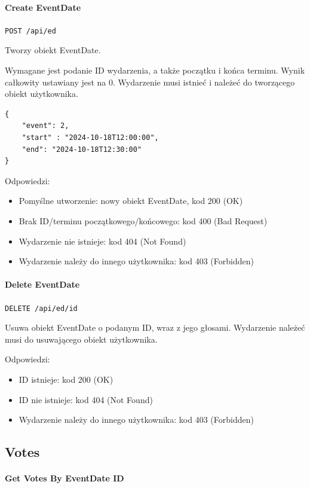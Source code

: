 \documentclass[a4paper,twoside,12pt]{book}
\begin{document}
\paragraph{Create EventDate}

\texttt{POST /api/ed}

Tworzy obiekt EventDate.

Wymagane jest podanie ID wydarzenia, a także początku i końca terminu. Wynik całkowity ustawiany jest na 0. Wydarzenie musi istnieć i należeć do tworzącego obiekt użytkownika.

\begin{verbatim}
{
    "event": 2,
    "start" : "2024-10-18T12:00:00",
    "end": "2024-10-18T12:30:00"
}
\end{verbatim}

Odpowiedzi: 
\begin{itemize}
	\item Pomyślne utworzenie: nowy obiekt EventDate, kod 200 (OK) 
	\item Brak ID/terminu początkowego/końcowego: kod 400 (Bad Request)
	\item Wydarzenie nie istnieje: kod 404 (Not Found) 
	\item Wydarzenie należy do innego użytkownika: kod 403 (Forbidden) 
\end{itemize}

\paragraph{Delete EventDate}

\texttt{DELETE /api/ed/{id}}

Usuwa obiekt EventDate o podanym ID, wraz z jego głosami. Wydarzenie należeć musi do usuwającego obiekt użytkownika.

Odpowiedzi: 
\begin{itemize}
	\item ID istnieje: kod 200 (OK) 
	\item ID nie istnieje: kod 404 (Not Found)
	\item Wydarzenie należy do innego użytkownika: kod 403 (Forbidden) 
\end{itemize}

\subsection{Votes}

\paragraph{Get Votes By EventDate ID}
\end{document}
